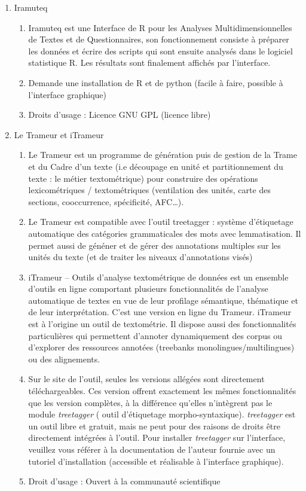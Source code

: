 \documentclass{book}
\begin{document}
\begin{enumerate}
    \item Iramuteq
    \begin{enumerate}
        \item Iramuteq est une Interface de R pour les Analyses Multidimensionnelles de Textes et de Questionnaires, son fonctionnement consiste à préparer les données et écrire des scripts qui sont ensuite analysés dans le logiciel statistique R. Les résultats sont finalement affichés par l'interface.
        \item Demande une installation de R et de python (facile à faire, possible à l'interface graphique)
        \item Droits d'usage : Licence GNU GPL (licence libre)    
    \end{enumerate}
    
    \item Le Trameur et iTrameur %
    \begin{enumerate}
        \item Le Trameur est un programme de génération puis de gestion de la Trame et du Cadre d’un texte (i.e découpage en unité et partitionnement du texte : le métier textométrique) pour construire des opérations lexicométriques / textométriques (ventilation des unités, carte des sections, cooccurrence, spécificité, AFC…).
        \item Le Trameur est compatible avec l'outil treetagger : système d’étiquetage automatique des catégories grammaticales des mots avec lemmatisation. Il permet aussi de généner et de gérer des annotations multiples sur les unités du texte (et de traiter les niveaux d’annotations visés)
        \item iTrameur – Outils d’analyse textométrique de données est un ensemble d’outils en ligne comportant plusieurs fonctionnalités de l’analyse automatique de textes en vue de leur profilage sémantique, thématique et de leur interprétation. C'est une version en ligne du Trameur.
        iTrameur est à l’origine un outil de textométrie. Il dispose aussi des fonctionnalités particulières qui permettent d’annoter dynamiquement des corpus ou d’explorer des ressources annotées (treebanks monolingues/multilingues) ou des alignements.
        \item Sur le site de l'outil, seules les versions allégées sont directement téléchargeables. Ces version offrent exactement les mêmes fonctionnalités que les version complètes, à la différence qu'elles n'intègrent pas le module \textit{treetagger} ( outil d'étiquetage morpho-syntaxique). \textit{treetagger} est un outil libre et gratuit, mais ne peut pour des raisons de droits être directement intégrées à l'outil. Pour installer \textit{treetagger} sur l'interface, veuillez vous référer à la documentation de l'auteur fournie avec un tutoriel d'installation (accessible et réalisable à l'interface graphique).
        \item Droit d'usage : Ouvert à la communauté scientifique
    \end{enumerate}
    

\end{enumerate}
\end{document}
